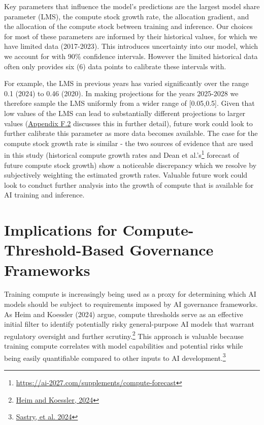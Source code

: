 \documentclass[11pt]{article}
\begin{document}
Key parameters that influence the model's predictions are the largest model share parameter (LMS), the compute stock growth rate, the allocation gradient, and the allocation of the compute stock between training and inference. Our choices for most of these parameters are informed by their historical values, for which we have limited data (2017-2023). This introduces uncertainty into our model, which we account for with 90\% confidence intervals. However the limited historical data often only provides six (6) data points to calibrate these intervals with.

For example, the LMS in previous years has varied significantly over the range 0.1 (2024) to 0.46 (2020). In making projections for the years 2025-2028 we therefore sample the LMS uniformly from a wider range of [0.05,0.5]. Given that low values of the LMS can lead to substantially different projections to larger values (\underline{\hyperref[f.2-influence-of-lms-on-projections]{Appendix F.2}} discusses this in further detail), future work could look to further calibrate this parameter as more data becomes available. The case for the compute stock growth rate is similar - the two sources of evidence that are used in this study (historical compute growth rates and Dean et al.'s\footnote{\href{https://ai-2027.com/supplements/compute-forecast}{https://ai-2027.com/supplements/compute-forecast}} forecast of future compute stock growth) show a noticeable discrepancy which we resolve by subjectively weighting the estimated growth rates. Valuable future work could look to conduct further analysis into the growth of compute that is available for AI training and inference.

\section{Implications for Compute-Threshold-Based Governance Frameworks}

Training compute is increasingly being used as a proxy for determining which AI models should be subject to requirements imposed by AI governance frameworks. As Heim and Koessler (2024) argue, compute thresholds serve as an effective initial filter to identify potentially risky general-purpose AI models that warrant regulatory oversight and further scrutiny.\footnote{\href{https://arxiv.org/abs/2405.10799}{Heim and Koessler, 2024}} This approach is valuable because training compute correlates with model capabilities and potential risks while being easily quantifiable compared to other inputs to AI development.\footnote{\href{https://arxiv.org/abs/2402.08797}{Sastry, et al. 2024}}
\end{document}
